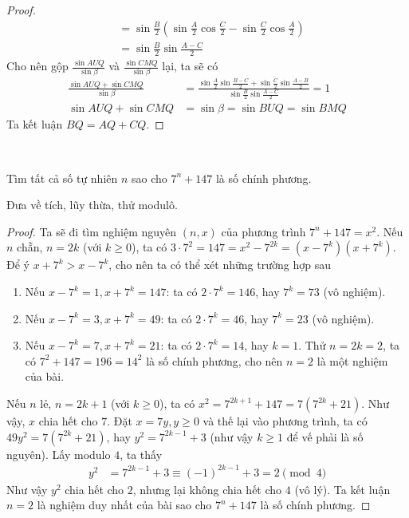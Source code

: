 \documentclass{treatise}
\begin{document}
\begin{proof}
\begin{align*}
& = \sin \frac{B}{2} \left( \sin \frac{A}{2} \cos \frac{C}{2} - \sin \frac{C}{2} \cos \frac{A}{2} \right)
\\
& = \sin \frac{B}{2} \sin \frac{A - C}{2}
\end{align*}
Cho nên gộp $\frac{\sin AUQ}{\sin \beta}$ và $\frac{\sin CMQ}{\sin \beta}$ lại, ta sẽ có
\begin{align*}
\frac{\sin AUQ + \sin CMQ}{\sin \beta} & = \frac{\sin \frac{A}{2} \sin \frac{B - C}{2} + \sin \frac{C}{2} \sin \frac{A - B}{2}}{\sin \frac{B}{2} \sin \frac{A-C}{2}} = 1
\\
\sin AUQ + \sin CMQ & = \sin \beta = \sin BUQ = \sin BMQ
\end{align*}
Ta kết luận $BQ = AQ + CQ$.
\end{proof}
\ \\
\begin{exercise}
Tìm tất cả số tự nhiên $n$ sao cho $7^n + 147$ là số chính phương.
\end{exercise}
\begin{remark}
Đưa về tích, lũy thừa, thử modulô.
\end{remark}
\begin{proof}
Ta sẽ đi tìm nghiệm nguyên $(n, x)$ của phương trình $7^n + 147 = x^2$. Nếu $n$ chẵn, $n = 2k$ (với $k \geq 0$), ta có $3 \cdot 7^2=147 = x^2 - 7^{2k} = (x - 7^k)(x + 7^k)$. Để ý $x + 7^k > x - 7^k$, cho nên ta có thể xét những trường hợp sau
\begin{enumerate}
	\item Nếu $x - 7^k = 1, x + 7^k = 147$: ta có $2 \cdot 7^k = 146$, hay $7^k = 73$ (vô nghiệm).
	\item Nếu $x - 7^k = 3, x + 7^k = 49$: ta có $2 \cdot 7^k = 46$, hay $7^k = 23$ (vô nghiệm).
	\item Nếu $x - 7^k = 7, x + 7^k = 21$: ta có $2 \cdot 7^k = 14$, hay $k = 1$. Thử $n = 2k = 2$, ta có $7^2 + 147 = 196 = 14^2$ là số chính phương, cho nên $n = 2$ là một nghiệm của bài.
\end{enumerate}
Nếu $n$ lẻ, $n = 2k + 1$ (với $k \geq 0$), ta có $x^2 = 7^{2k + 1} + 147 = 7 (7^{2k} + 21)$. Như vậy, $x$ chia hết cho $7$. Đặt $x = 7y, y \geq 0$ và thế lại vào phương trình, ta có $49y^2 = 7 (7^{2k} + 21)$, hay $y^2 = 7^{2k - 1} + 3$ (như vậy $k \geq 1$ để vế phải là số nguyên). Lấy modulo $4$, ta thấy
\begin{align*}
y^2 & = 7^{2k - 1} + 3 \equiv (-1)^{2k - 1} + 3 = 2 \pmod{4}
\end{align*}
Như vậy $y^2$ chia hết cho $2$, nhưng lại không chia hết cho $4$ (vô lý). Ta kết luận $n = 2$ là nghiệm duy nhất của bài sao cho $7^n + 147$ là số chính phương.
\end{proof}
\end{document}
